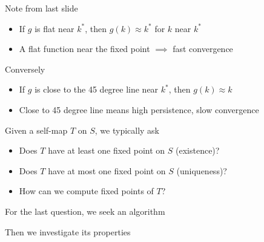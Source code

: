 \begin{frame}
    
    Note from last slide

    \begin{itemize}
        \item If $g$ is flat near $k^*$, then $g(k) \approx k^*$ for $k$ near $k^*$
    \vspace{0.3em}
        \item A flat function near the fixed point $\implies$ fast convergence
    \end{itemize}

    \vspace{0.3em}
    \vspace{0.3em}
    Conversely

    \begin{itemize}
        \item If $g$ is close to the 45 degree line near $k^*$, then $g(k)
            \approx k$ 
    \vspace{0.3em}
        \item Close to 45 degree line means high persistence, slow convergence
    \end{itemize}


\end{frame}




\begin{frame}

    Given a self-map $T$ on $S$, we typically ask
    \begin{itemize}
        \item Does $T$ have at least one fixed point on $S$ (existence)?
    \vspace{0.3em}
        \item Does $T$ have at most one fixed point on $S$ (uniqueness)?
    \vspace{0.3em}
        \item How can we compute fixed points of $T$?
    \end{itemize}

    \vspace{0.3em}
    For the last question, we seek an algorithm

    \vspace{0.3em}
    \vspace{0.3em}
    Then we investigate its properties

\end{frame}

